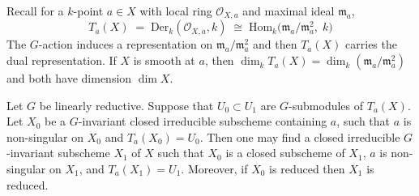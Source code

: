 \documentclass[12pt]{article}
\begin{document}
\begin{remark}
    Recall for a $k$-point $a\in X$ with local ring $\mathcal{O}_{X,a}$ and maximal ideal $\mathfrak{m}_a$,
\[T_a(X)\;=\;\mathrm{Der}_k(\mathcal{O}_{X,a},k)\;\cong\;\mathrm{Hom}_k\!\big(\mathfrak{m}_a/\mathfrak{m}_a^2,\;k\big)\]
The $G$-action induces a representation on $\mathfrak{m}_a/\mathfrak{m}_a^2$ and then $T_a(X)$ carries the dual representation. If $X$ is smooth at $a$, then $\dim_k T_a(X)=\dim_k(\mathfrak{m}_a/\mathfrak{m}_a^2)$ and both have dimension $\dim X$.
\end{remark}

\begin{theorem}[2.1]
Let $G$ be linearly reductive. Suppose that $U_0 \subset U_1$ are $G$-submodules of $T_a(X)$.  
Let $X_0$ be a $G$-invariant closed irreducible subscheme containing $a$, such that $a$ is non-singular on $X_0$ and $T_a(X_0) = U_0$.  
Then one may find a closed irreducible $G$-invariant subscheme $X_1$ of $X$ such that $X_0$ is a closed subscheme of $X_1$, $a$ is non-singular on $X_1$, and $T_a(X_1) = U_1$.  
Moreover, if $X_0$ is reduced then $X_1$ is reduced.
\end{theorem}
\end{document}
